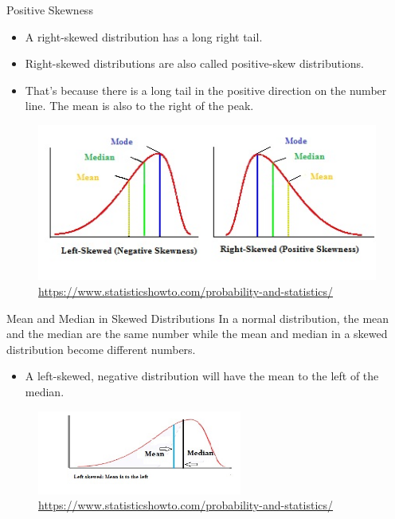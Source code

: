\documentclass[10pt,dvipsnames, aspectratio=169]{beamer}
\begin{document}
\begin{frame}[t]{Positive Skewness}
	\begin{itemize}
		\item A right-skewed distribution has a long right tail. 
		\item Right-skewed distributions are also called positive-skew 
		distributions.
		\item That’s because there is a long tail in the positive direction on 
		the number line. The mean is also to the right of the peak.
	\end{itemize}
	
	\begin{figure} [ht]
		\centering
		\includegraphics[trim={6cm 0 0 0}, clip, 
		scale=0.7]{eda/pearson-mode-skewness.jpg}
		\caption{\url{https://www.statisticshowto.com/probability-and-statistics/}}
	\end{figure}
\end{frame}


\begin{frame}[t]{Mean and Median in Skewed Distributions}
	In a normal distribution, the mean and the median are the same 
	number while the mean and median in a skewed distribution become 
	different numbers.
	\begin{itemize}
		\item A left-skewed, negative distribution will have the mean to the 
		left of the median.
	\end{itemize}
	\begin{figure} [ht]
		\centering
		\includegraphics[width=0.6\textwidth]{eda/left-skewed.jpg}
		\caption{\url{https://www.statisticshowto.com/probability-and-statistics/}}
	\end{figure}
\end{frame}
\end{document}
